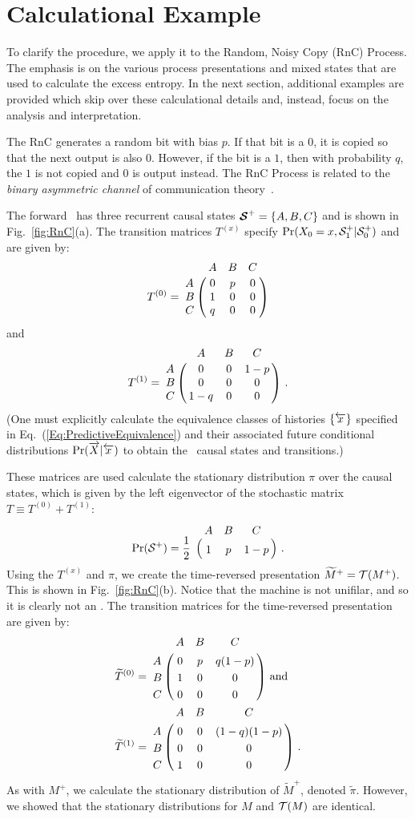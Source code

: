 \section{Calculational Example}

To clarify the procedure, we apply it to the Random, Noisy Copy (RnC) Process.
The emphasis is on the various process presentations and mixed states that
are used to calculate the excess entropy. In the next section, additional
examples are provided which skip over these calculational details and, instead,
focus on the analysis and interpretation.

The RnC generates a random bit with bias $p$. If that bit is a $0$, it is
copied so that the next output is also $0$. However, if the bit is a $1$, 
then with probability $q$, the $1$ is not copied and $0$ is output 
instead. The RnC Process is related to the \emph{binary asymmetric channel}
of communication theory~\cite{Cove06a}.

The forward \eM\ has three recurrent causal states 
${\boldsymbol{\mathcal{S}}}^{+} = \{A,B,C\}$ and is shown in Fig.~\ref{fig:RnC}(a).
The transition matrices $T^{(x)}$ specify
$\Pr({X}_0=x, {\mathcal{S}}^{+}_1|{\mathcal{S}}^{+}_0)$
and are given by:
\begin{equation*}
T^{(0)} = 
\bordermatrix{ 
  & A & B & C\cr
A & 0 & p & 0\cr
B & 1 & 0 & 0\cr
C & q & 0 & 0
} \\
\end{equation*}
and
\begin{equation*}
T^{(1)} = 
\bordermatrix{ 
  & A & B & C\cr
A & 0 & 0 & 1-p\cr
B & 0 & 0 & 0\cr
C & 1-q & 0 & 0
} ~.
\end{equation*}
(One must explicitly calculate the equivalence classes of histories $\{\smash{\overleftarrow {{x}}}\}$
specified in Eq.~(\ref{Eq:PredictiveEquivalence}) and their associated future
conditional distributions $\Pr(\smash{\overrightarrow{{X}}}|\smash{\overleftarrow {{x}}})$ to obtain the \eM\ causal states
and transitions.)

These matrices are used calculate the stationary distribution $\pi$ over the 
causal states, which is given by the left eigenvector of the stochastic
matrix $T \equiv T^{(0)} + T^{(1)}$:
\begin{align*}
\Pr(\FutureCausalState) = \frac{1}{2} \bordermatrix{
  & A & B & C\cr
  & 1 & p & 1-p
} ~.
\end{align*}
Using the $T^{(x)}$ and $\pi$, we create the time-reversed presentation
$\widetilde{M}^+ = \mathcal{T}({M}^{+})$. This is shown in Fig.~\ref{fig:RnC}(b).
Notice that the machine is not unifilar, and so it is clearly not an \eM.
The transition matrices for the time-reversed presentation are given by:
\begin{align*}
\widetilde{T}^{(0)} &=
\bordermatrix{ 
  & A & B & C\cr
A & 0 & p & q(1-p)\cr
B & 1 & 0 & 0\cr
C & 0 & 0 & 0
} \mathrm{~and}\\
\widetilde{T}^{(1)} &=
\bordermatrix{ 
  & A & B & C\cr
A & 0 & 0 & (1-q)(1-p)\cr
B & 0 & 0 & 0\cr
C & 1 & 0 & 0
}~.
\end{align*}
As with $M^+$, we calculate the stationary distribution of $\widetilde{M}^+$,
denoted $\widetilde{\pi}$. However, we showed that the stationary
distributions for $M$ and $\mathcal{T}(M)$ are identical.

